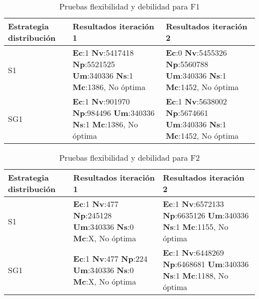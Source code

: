 \begin{center}
\begin{longtable}{|p{4cm}|p{6.5cm}|p{6.5cm}|}
	\caption{Pruebas flexibilidad y debilidad para F1}\\
	\hline
	\cellcolor[gray]{0.9} \textbf{Estrategia distribución} & \cellcolor[gray]{0.9}\textbf{Resultados iteración 1}  &\cellcolor[gray]{0.9} \textbf{Resultados iteración 2} \\
	\hline
	S1& \textbf{Ec}:1 \textbf{Nv}:5417418  \textbf{Np}:5521525  \textbf{Um}:340336  \textbf{Ns}:1 \textbf{Mc}:1386, No óptima & \textbf{Ec}:0 \textbf{Nv}:5455326  \textbf{Np}:5560788  \textbf{Um}:340336  \textbf{Ns}:1 \textbf{Mc}:1452, No óptima\\
	\hline
	SG1& \textbf{Ec}:1 \textbf{Nv}:901970  \textbf{Np}:984496  \textbf{Um}:340336  \textbf{Ns}:1 \textbf{Mc}:1386, No óptima & \textbf{Ec}:1 \textbf{Nv}:5638002  \textbf{Np}:5674661  \textbf{Um}:340336  \textbf{Ns}:1 \textbf{Mc}:1452, No óptima\\
	\hline
\end{longtable}	
\end{center}


\begin{center}
\begin{longtable}{|p{4cm}|p{6.5cm}|p{6.5cm}|}
	\caption{Pruebas flexibilidad y debilidad para F2} \\
	\hline
	\cellcolor[gray]{0.9} \textbf{Estrategia distribución} & \cellcolor[gray]{0.9}\textbf{Resultados iteración 1} &\cellcolor[gray]{0.9} \textbf{Resultados iteración 2} \\
	\hline
	S1& \textbf{Ec}:1 \textbf{Nv}:477  \textbf{Np}:245128  \textbf{Um}:340336  \textbf{Ns}:0 \textbf{Mc}:X, No óptima & \textbf{Ec}:1 \textbf{Nv}:6572133  \textbf{Np}:6635126  \textbf{Um}:340336  \textbf{Ns}:1 \textbf{Mc}:1155, No óptima\\
	\hline
	SG1& \textbf{Ec}:1 \textbf{Nv}:477  \textbf{Np}:224  \textbf{Um}:340336  \textbf{Ns}:0 \textbf{Mc}:X, No óptima & \textbf{Ec}:1 \textbf{Nv}:6448269  \textbf{Np}:6468681  \textbf{Um}:340336  \textbf{Ns}:1 \textbf{Mc}:1188, No óptima\\
	\hline
\end{longtable}	
\end{center}


